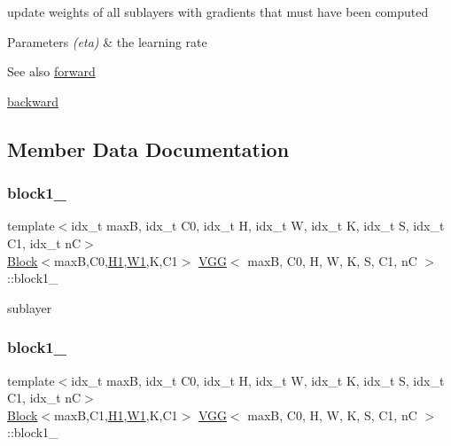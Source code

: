 update weights of all sublayers with gradients that must have been computed 


\begin{DoxyParams}{Parameters}
{\em (eta)} & the learning rate \\
\hline
\end{DoxyParams}
\begin{DoxySeeAlso}{See also}
\hyperlink{structVGG_a256a1792818900ab2023554cea1ebb31}{forward} 

\hyperlink{structVGG_ad6c413558605836d7cffa87dc2971628}{backward} 
\end{DoxySeeAlso}


\subsection{Member Data Documentation}
\mbox{\label{structVGG_ac5d2224851fa2936be629e3fdf89c959}} 
\subsubsection{\texorpdfstring{block1\+\_}{block1\_1}}
{\footnotesize\ttfamily template$<$idx\+\_\+t maxB, idx\+\_\+t C0, idx\+\_\+t H, idx\+\_\+t W, idx\+\_\+t K, idx\+\_\+t S, idx\+\_\+t C1, idx\+\_\+t nC$>$ \\
\hyperlink{structBlock}{Block}$<$maxB,C0,\hyperlink{structVGG_a73f189c70eef33b8e8de32929db37b10}{H1},\hyperlink{structVGG_a01305ab6d90c95eb50c45352203b07e0}{W1},K,C1$>$ \hyperlink{structVGG}{V\+GG}$<$ maxB, C0, H, W, K, S, C1, nC $>$\+::block1\+\_}

sublayer \mbox{\label{structVGG_a8f6b6e4fa1009a0730e8ac7417ca4386}} 
\subsubsection{\texorpdfstring{block1\+\_}{block1\_2}}
{\footnotesize\ttfamily template$<$idx\+\_\+t maxB, idx\+\_\+t C0, idx\+\_\+t H, idx\+\_\+t W, idx\+\_\+t K, idx\+\_\+t S, idx\+\_\+t C1, idx\+\_\+t nC$>$ \\
\hyperlink{structBlock}{Block}$<$maxB,C1,\hyperlink{structVGG_a73f189c70eef33b8e8de32929db37b10}{H1},\hyperlink{structVGG_a01305ab6d90c95eb50c45352203b07e0}{W1},K,C1$>$ \hyperlink{structVGG}{V\+GG}$<$ maxB, C0, H, W, K, S, C1, nC $>$\+::block1\+\_}

